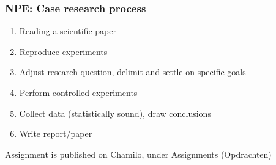 \documentclass{beamer}
\begin{document}
\begin{frame}
  \frametitle{NPE: Case research process}


  \begin{enumerate}
    \item Reading a scientific paper
    \item Reproduce experiments
    \item Adjust research question, delimit and settle on specific goals
    \item Perform controlled experiments
    \item Collect data (statistically sound), draw conclusions
    \item Write report/paper
  \end{enumerate}

  Assignment is published on Chamilo, under Assignments (Opdrachten)
\end{frame}


\end{document}
